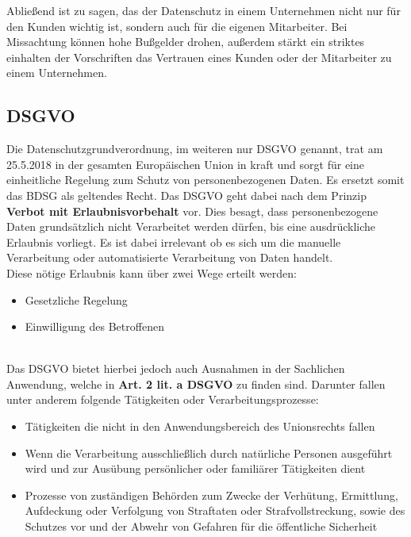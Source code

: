 \documentclass[a4paper, 12pt]{article}
\begin{document}
Abließend ist zu sagen, das der Datenschutz in einem Unternehmen nicht nur für den Kunden wichtig ist, sondern auch für die eigenen Mitarbeiter. Bei Missachtung können hohe Bußgelder drohen, außerdem stärkt ein striktes einhalten der Vorschriften das Vertrauen eines Kunden oder der Mitarbeiter zu einem Unternehmen.
\cite{Bundesdatenschutzgesetz,datenschutz_unternehmen}

\subsection{DSGVO}

Die Datenschutzgrundverordnung, im weiteren nur DSGVO genannt, trat am 25.5.2018 in der gesamten Europäischen Union in kraft und sorgt für eine einheitliche Regelung zum Schutz von personenbezogenen Daten. Es ersetzt somit das BDSG als geltendes Recht. Das DSGVO geht dabei nach dem Prinzip \textbf{Verbot mit Erlaubnisvorbehalt} vor. Dies besagt, dass personenbezogene Daten grundsätzlich nicht Verarbeitet werden dürfen, bis eine ausdrückliche Erlaubnis vorliegt. Es ist dabei irrelevant ob es sich um die manuelle Verarbeitung oder automatisierte Verarbeitung von Daten handelt.\\Diese nötige Erlaubnis kann über zwei Wege erteilt werden:
\begin{itemize}
	\item Gesetzliche Regelung
	\item Einwilligung des Betroffenen
\end{itemize}
\cite{datenschutz_dsgvo}\\
\noindent Das DSGVO bietet hierbei jedoch auch Ausnahmen in der Sachlichen Anwendung, welche in \textbf{Art. 2 lit. a DSGVO} zu finden sind. Darunter fallen unter anderem folgende Tätigkeiten oder Verarbeitungsprozesse:
\begin{itemize}
	\item Tätigkeiten die nicht in den Anwendungsbereich des Unionsrechts fallen
	\item Wenn die Verarbeitung ausschließlich durch natürliche Personen ausgeführt wird und zur Ausübung persönlicher oder familiärer Tätigkeiten dient
	\item Prozesse von zuständigen Behörden zum Zwecke der Verhütung, Ermittlung, Aufdeckung oder Verfolgung von Straftaten oder Strafvollstreckung, sowie des Schutzes vor und der Abwehr von Gefahren für die öffentliche Sicherheit
\end{itemize}
\cite{noauthor_datenschutz-grundverordnung_nodate}\\
\end{document}
